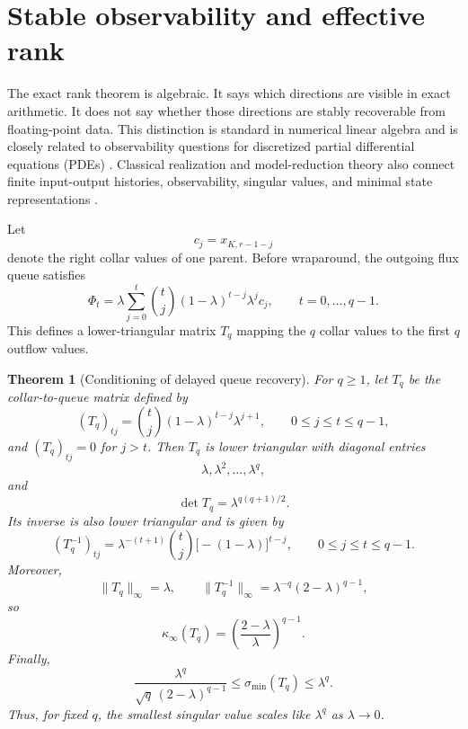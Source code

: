 \documentclass[pdflatex,sn-mathphys-num]{sn-jnl}%
\newtheorem{theorem}{Theorem}
\theoremstyle{thmstyleone}%
\theoremstyle{thmstyletwo}%
\theoremstyle{thmstylethree}%
\begin{document}
\section{Stable observability and effective rank}
\label{sec:stable-observability}

The exact rank theorem is algebraic.  It says which directions are visible
in exact arithmetic.  It does not say whether those directions are stably
recoverable from floating-point data.  This distinction is standard in
numerical linear algebra \cite{TrefethenBau:1997nla,Higham:2002accuracy} and is closely related to observability questions for discretized partial differential equations (PDEs) \cite{CohnDee:1988observability}.  Classical realization and model-reduction theory also connect finite input-output
histories, observability, singular values, and minimal state representations
\cite{HoKalman:1966realization,Moore:1981pca}.

Let
\[
  c_j=x_{K,r-1-j}
\]
denote the right collar values of one parent.  Before wraparound, the
outgoing flux queue satisfies
\[
  \Phi_t
  =
  \lambda
  \sum_{j=0}^{t}
  \binom{t}{j}
  (1-\lambda)^{t-j}\lambda^j c_j,
  \qquad
  t=0,\ldots,q-1.
\]
This defines a lower-triangular matrix \(T_q\) mapping the \(q\) collar
values to the first \(q\) outflow values.

\begin{theorem}[Conditioning of delayed queue recovery]
\label{thm:conditioning}
For \(q\ge1\), let \(T_q\) be the collar-to-queue matrix defined by
\[
  (T_q)_{tj}
  =
  \binom{t}{j}(1-\lambda)^{t-j}\lambda^{j+1},
  \qquad
  0\le j\le t\le q-1,
\]
and \((T_q)_{tj}=0\) for \(j>t\).  Then \(T_q\) is lower triangular with
diagonal entries
\[
  \lambda,\lambda^2,\ldots,\lambda^q,
\]
and
\[
  \det T_q=\lambda^{q(q+1)/2}.
\]
Its inverse is also lower triangular and is given by
\[
  (T_q^{-1})_{tj}
  =
  \lambda^{-(t+1)}
  \binom{t}{j}
  \bigl[-(1-\lambda)\bigr]^{t-j},
  \qquad
  0\le j\le t\le q-1.
\]
Moreover,
\[
  \|T_q\|_\infty=\lambda,
  \qquad
  \|T_q^{-1}\|_\infty
  =
  \lambda^{-q}(2-\lambda)^{q-1},
\]
so
\[
  \kappa_\infty(T_q)
  =
  \left(\frac{2-\lambda}{\lambda}\right)^{q-1}.
\]
Finally,
\[
  \frac{\lambda^q}{\sqrt q\,(2-\lambda)^{q-1}}
  \le
  \sigma_{\min}(T_q)
  \le
  \lambda^q.
\]
Thus, for fixed \(q\), the smallest singular value scales like
\(\lambda^q\) as \(\lambda\to0\).
\end{theorem}
\end{document}
